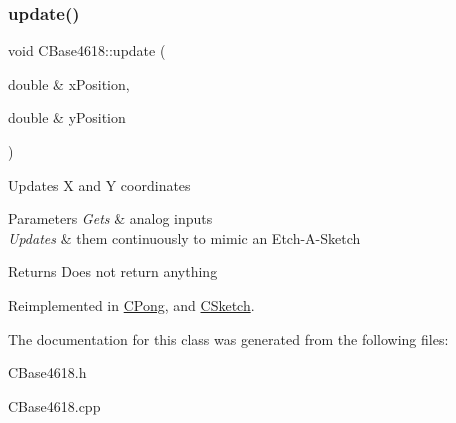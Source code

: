 \subsubsection{\texorpdfstring{update()}{update()}}
{\footnotesize\ttfamily void C\+Base4618\+::update (\begin{DoxyParamCaption}\item[{double \&}]{x\+Position,  }\item[{double \&}]{y\+Position }\end{DoxyParamCaption})\hspace{0.3cm}{\ttfamily [virtual]}}

Updates X and Y coordinates


\begin{DoxyParams}{Parameters}
{\em Gets} & analog inputs \\
\hline
{\em Updates} & them continuously to mimic an Etch-\/\+A-\/\+Sketch\\
\hline
\end{DoxyParams}
\begin{DoxyReturn}{Returns}
Does not return anything 
\end{DoxyReturn}


Reimplemented in \hyperlink{class_c_pong_a036cdd714486e765a658b835547d058e}{C\+Pong}, and \hyperlink{class_c_sketch_a81582a1c6eb7524db76546565412a88b}{C\+Sketch}.



The documentation for this class was generated from the following files\+:\begin{DoxyCompactItemize}
\item 
C\+Base4618.\+h\item 
C\+Base4618.\+cpp\end{DoxyCompactItemize}
